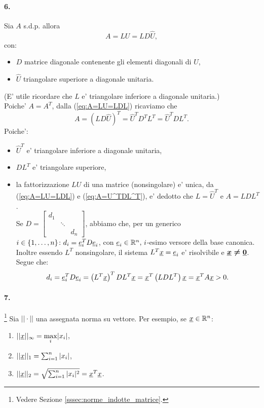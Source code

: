 \paragraph{6.} Sia $A$ s.d.p. allora
\begin{equation}\label{eq:A=LU=LDL}
	A = LU = L D \hat{U},
\end{equation}
con:
\begin{itemize}
	\item $D$ matrice diagonale contenente gli elementi diagonali di $U$,
	\item $\hat{U}$ triangolare superiore a diagonale unitaria.
\end{itemize}
(E' utile ricordare che $L$ e' triangolare inferiore a diagonale unitaria.)\\
Poiche' $A=A^T$, dalla (\ref{eq:A=LU=LDL}) ricaviamo che
\begin{equation}\label{eq:A=U^TDL^T}
	A = (L D \hat{U})^T = \hat{U}^T D^T L^T = \hat{U}^T D L^T.
\end{equation}
Poiche':
\begin{itemize}
	\item $\hat{U}^T$ e' triangolare inferiore a diagonale unitaria,
	\item $DL^T$ e' triangolare superiore,
	\item la fattorizzazione $LU$ di una matrice (nonsingolare) e' unica, da (\ref{eq:A=LU=LDL}) e (\ref{eq:A=U^TDL^T}), e' dedotto che $L=\hat{U}^T$ e $A=LDL^T$.\\
	Se $D =
	\begin{bmatrix}
		d_1\\
		&\ddots\\
		& & d_n
	\end{bmatrix}$, abbiamo che, per un generico $i\in\{1,\hdots, n\}\colon d_i = \uline e_i^T D \uline e_i$, con $\uline e_i\in\mathbb{R}^n,\, i$-esimo versore della base canonica. Inoltre essendo $L^T$ nonsingolare, il sistema $L^T\uline x = \uline e_i$ e' risolvibile e $\boldsymbol{\uline x\neq \uline 0}$. Segue che:
	\begin{equation*}
		d_i = \uline e_i^T D \uline e_i = \left(L^T\uline x\right)^T D L^T \uline x =\uline x^T \left(LDL^T\right) \uline x = \uline x^T A \uline x > 0.
	\end{equation*}
\end{itemize}


\paragraph{7.}\footnote{Vedere Sezione \ref{sssec:norme_indotte_matrice}.} Sia $||\cdot||$ una assegnata norma su vettore. Per esempio, se $\uline x\in\mathbb{R}^n$:
\begin{enumerate}
	\item $||\uline x||_\infty = \underset{i}{\max}|x_i|$,
	\item $||\uline x||_1 = \sum_{i=1}^{n}|x_i|$,
	\item $||\uline x||_2 = \sqrt{\sum_{i=1}^{n}|x_i|^2} = \uline x^T\uline x$.
\end{enumerate}

